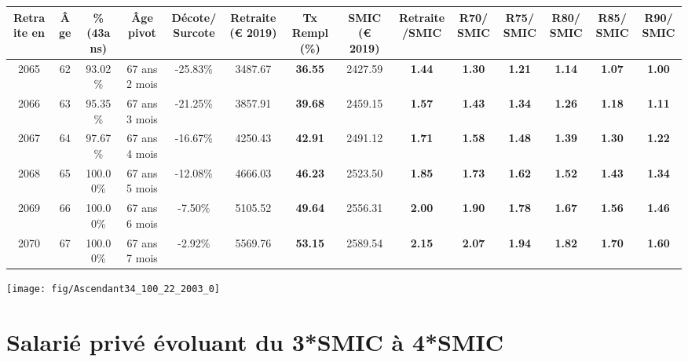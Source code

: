 \begin{adjustbox}{max width=\textwidth} 
\begin{tabular}[htb]{|c|c||c|c|c||c|c||c|c||c|c|c|c|c|} 
\hline 
 Retraite en &  Âge &  \%(43ans) &  Âge pivot &  Décote/Surcote &  Retraite (\euro{} 2019) &  Tx Rempl(\%) &  SMIC (\euro{} 2019) &  Retraite/SMIC &  R70/SMIC &  R75/SMIC &  R80/SMIC &  R85/SMIC &  R90/SMIC \\ 
\hline \hline 
 2065 &  62 &  93.02\% &  67 ans 2 mois &  -25.83\% &  3487.67 &  {\bf 36.55} &  2427.59 &  {\bf 1.44} &  {\bf 1.30} &  {\bf 1.21} &  {\bf 1.14} &  {\bf 1.07} &  {\bf 1.00} \\ 
\hline 
 2066 &  63 &  95.35\% &  67 ans 3 mois &  -21.25\% &  3857.91 &  {\bf 39.68} &  2459.15 &  {\bf 1.57} &  {\bf 1.43} &  {\bf 1.34} &  {\bf 1.26} &  {\bf 1.18} &  {\bf 1.11} \\ 
\hline 
 2067 &  64 &  97.67\% &  67 ans 4 mois &  -16.67\% &  4250.43 &  {\bf 42.91} &  2491.12 &  {\bf 1.71} &  {\bf 1.58} &  {\bf 1.48} &  {\bf 1.39} &  {\bf 1.30} &  {\bf 1.22} \\ 
\hline 
 2068 &  65 &  100.00\% &  67 ans 5 mois &  -12.08\% &  4666.03 &  {\bf 46.23} &  2523.50 &  {\bf 1.85} &  {\bf 1.73} &  {\bf 1.62} &  {\bf 1.52} &  {\bf 1.43} &  {\bf 1.34} \\ 
\hline 
 2069 &  66 &  100.00\% &  67 ans 6 mois &  -7.50\% &  5105.52 &  {\bf 49.64} &  2556.31 &  {\bf 2.00} &  {\bf 1.90} &  {\bf 1.78} &  {\bf 1.67} &  {\bf 1.56} &  {\bf 1.46} \\ 
\hline 
 2070 &  67 &  100.00\% &  67 ans 7 mois &  -2.92\% &  5569.76 &  {\bf 53.15} &  2589.54 &  {\bf 2.15} &  {\bf 2.07} &  {\bf 1.94} &  {\bf 1.82} &  {\bf 1.70} &  {\bf 1.60} \\ 
\hline 
\hline 
\end{tabular} 
\end{adjustbox} 
 
 \vspace{0.1cm} 

 {\hspace{-2.2cm}\texttt{[image: fig/Ascendant34\_100\_22\_2003\_0]}} 

\newpage 
 
\chapter{Salarié privé évoluant du 3*SMIC à 4*SMIC} 

~\\ 
 
